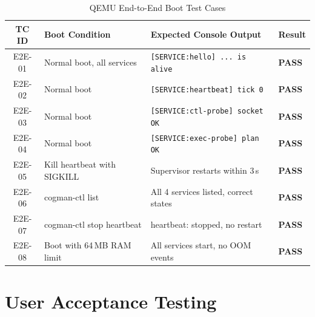 \documentclass[12pt,a4paper]{report}
\begin{document}
\begin{table}[H]
\centering
\caption{QEMU End-to-End Boot Test Cases}
\renewcommand{\arraystretch}{1.2}
\begin{tabularx}{\linewidth}{c X X >{\centering\arraybackslash}p{1.2cm}}
\toprule
\textbf{TC ID} & \textbf{Boot Condition} & \textbf{Expected Console Output} & \textbf{Result}\\
\midrule
E2E-01 & Normal boot, all services   & \texttt{[SERVICE:hello] ... is alive}  & \textbf{PASS}\\
E2E-02 & Normal boot                 & \texttt{[SERVICE:heartbeat] tick 0}    & \textbf{PASS}\\
E2E-03 & Normal boot                 & \texttt{[SERVICE:ctl-probe] socket OK} & \textbf{PASS}\\
E2E-04 & Normal boot                 & \texttt{[SERVICE:exec-probe] plan OK}  & \textbf{PASS}\\
E2E-05 & Kill heartbeat with SIGKILL & Supervisor restarts within 3\,s    & \textbf{PASS}\\
E2E-06 & cogman-ctl list             & All 4 services listed, correct states  & \textbf{PASS}\\
E2E-07 & cogman-ctl stop heartbeat   & heartbeat: stopped, no restart         & \textbf{PASS}\\
E2E-08 & Boot with 64\,MB RAM limit  & All services start, no OOM events  & \textbf{PASS}\\
\bottomrule
\end{tabularx}
\end{table}

\FloatBarrier
\section{User Acceptance Testing}
\end{document}
